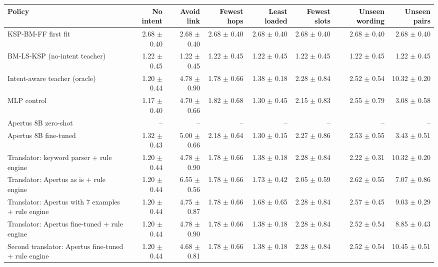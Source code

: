 \begin{tabular}{lrrrrrrr}
\toprule
Policy & No intent & Avoid link & Fewest hops & Least loaded & Fewest slots & Unseen wording & Unseen pairs \\
\midrule
KSP-BM-FF first fit & 2.68 $\pm$ 0.40 & 2.68 $\pm$ 0.40 & 2.68 $\pm$ 0.40 & 2.68 $\pm$ 0.40 & 2.68 $\pm$ 0.40 & 2.68 $\pm$ 0.40 & 2.68 $\pm$ 0.40 \\
BM-LS-KSP (no-intent teacher) & 1.22 $\pm$ 0.45 & 1.22 $\pm$ 0.45 & 1.22 $\pm$ 0.45 & 1.22 $\pm$ 0.45 & 1.22 $\pm$ 0.45 & 1.22 $\pm$ 0.45 & 1.22 $\pm$ 0.45 \\
Intent-aware teacher (oracle) & 1.20 $\pm$ 0.44 & 4.78 $\pm$ 0.90 & 1.78 $\pm$ 0.66 & 1.38 $\pm$ 0.18 & 2.28 $\pm$ 0.84 & 2.52 $\pm$ 0.54 & 10.32 $\pm$ 0.20 \\
MLP control & 1.17 $\pm$ 0.40 & 4.70 $\pm$ 0.66 & 1.82 $\pm$ 0.68 & 1.30 $\pm$ 0.45 & 2.15 $\pm$ 0.83 & 2.55 $\pm$ 0.79 & 3.08 $\pm$ 0.58 \\
Apertus 8B zero-shot & -- & -- & -- & -- & -- & -- & -- \\
Apertus 8B fine-tuned & 1.32 $\pm$ 0.43 & 5.00 $\pm$ 0.66 & 2.18 $\pm$ 0.64 & 1.30 $\pm$ 0.15 & 2.27 $\pm$ 0.86 & 2.53 $\pm$ 0.55 & 3.43 $\pm$ 0.51 \\
Translator: keyword parser + rule engine & 1.20 $\pm$ 0.44 & 4.78 $\pm$ 0.90 & 1.78 $\pm$ 0.66 & 1.38 $\pm$ 0.18 & 2.28 $\pm$ 0.84 & 2.22 $\pm$ 0.31 & 10.32 $\pm$ 0.20 \\
Translator: Apertus as is + rule engine & 1.20 $\pm$ 0.44 & 6.55 $\pm$ 0.56 & 1.78 $\pm$ 0.66 & 1.73 $\pm$ 0.42 & 2.05 $\pm$ 0.59 & 2.62 $\pm$ 0.55 & 7.07 $\pm$ 0.86 \\
Translator: Apertus with 7 examples + rule engine & 1.20 $\pm$ 0.44 & 4.75 $\pm$ 0.87 & 1.78 $\pm$ 0.66 & 1.68 $\pm$ 0.65 & 2.28 $\pm$ 0.84 & 2.57 $\pm$ 0.45 & 9.03 $\pm$ 0.29 \\
Translator: Apertus fine-tuned + rule engine & 1.20 $\pm$ 0.44 & 4.78 $\pm$ 0.90 & 1.78 $\pm$ 0.66 & 1.38 $\pm$ 0.18 & 2.28 $\pm$ 0.84 & 2.52 $\pm$ 0.54 & 8.85 $\pm$ 0.43 \\
Second translator: Apertus fine-tuned + rule engine & 1.20 $\pm$ 0.44 & 4.68 $\pm$ 0.81 & 1.78 $\pm$ 0.66 & 1.38 $\pm$ 0.18 & 2.28 $\pm$ 0.84 & 2.52 $\pm$ 0.54 & 10.45 $\pm$ 0.51 \\
\bottomrule
\end{tabular}

